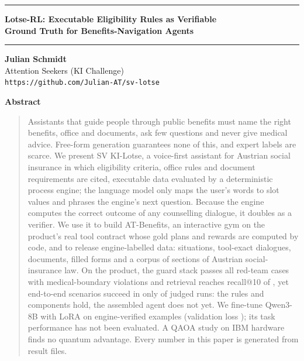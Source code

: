 \documentclass[10pt]{article}
\begin{document}
\begin{center}
\rule{\linewidth}{3pt}\par\vspace{0.6em}
{\LARGE\bfseries Lotse-RL: Executable Eligibility Rules as Verifiable\\[0.15em] Ground Truth for Benefits-Navigation Agents\par}
\vspace{0.5em}\rule{\linewidth}{1pt}\par\vspace{1.2em}
{\bfseries Julian Schmidt}\\
Attention Seekers (KI Challenge)\\
\texttt{\small https://github.com/Julian-AT/sv-lotse}\par
\vspace{0.4em}{\small Preprint, \today}
\end{center}
\vspace{0.5em}

\begin{center}\textbf{\large Abstract}\end{center}
\vspace{-0.4em}
\begin{quote}
\small
Assistants that guide people through public benefits must name the right benefits, office and
documents, ask few questions and never give medical advice. Free-form generation guarantees none of
this, and expert labels are scarce. We present SV KI-Lotse, a voice-first assistant for Austrian
social insurance in which eligibility criteria, office rules and document requirements are cited,
executable data evaluated by a deterministic process engine; the language model only maps the user's
words to slot values and phrases the engine's next question. Because the engine computes the correct
outcome of any counselling dialogue, it doubles as a verifier. We use it to build AT-Benefits, an
interactive gym on the product's real tool contract whose gold plans and rewards are computed by
code, and to release engine-labelled data: \DataSituations{} situations, \DataDialogues{} tool-exact
dialogues, \DataDocuments{} documents, \DataForms{} filled forms and a corpus of \DataLaw{} sections
of Austrian social-insurance law. On the product, the guard stack passes all \EvalEFiveCases{}
red-team cases with \EvalEFiveViolations{} medical-boundary violations and retrieval reaches
recall@10 of \EvalEThreeRecall{}, yet end-to-end scenarios succeed in only \EvalEFourSuccesses{} of
\EvalEFourJudged{} judged runs: the rules and components hold, the assembled agent does not yet. We
fine-tune Qwen3-8B with LoRA on \SftTrain{} engine-verified examples (validation loss
\SftValLoss{}); its task performance has not been evaluated. \TOneSentence{} A QAOA study on IBM
hardware finds no quantum advantage. Every number in this paper is generated from result files.
\end{quote}
\end{document}
